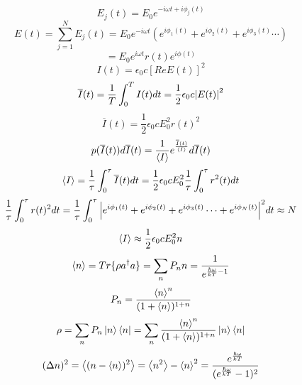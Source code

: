\documentclass[9pt]{article}
\begin{document}
\begin{equation}
    E_j(t)=E_0e^{-i\omega t + i\phi_j(t)}
\end{equation}
\begin{equation}
    E(t)=\sum^N_{j=1}E_j(t)=E_0e^{-i\omega t }(e^{i\phi_1(t)}+e^{i\phi_2(t)}+e^{i\phi_3(t)}\cdots)
\end{equation}
\begin{equation*}
        =E_0e^{i\omega t }r(t)e^{i\phi (t)}
\end{equation*}
\begin{equation}
    I(t)=\epsilon_0 c [Re E(t)]^2
\end{equation}
\begin{equation}
    \overline{I}(t)=\frac{1}{T}\int_0^T I(t) dt=\frac{1}{2}\epsilon_0 c \abs{E(t)}^2
\end{equation}
\begin{equation}
    \overline{I}(t)=\frac{1}{2}\epsilon_0 c E_0^2 r(t)^2
\end{equation}
\begin{equation}
    p(\overline{I}(t))d\overline{I}(t)=\frac{1}{\ev{I}}e^{\frac{\overline{I}(t)}{\ev{I}}}d\overline{I}(t)
\end{equation}
\begin{equation}
    \ev{I}=\frac{1}{\tau}\int_0^\tau \overline{I}(t) dt = \frac{1}{2}\epsilon_0 c E_0^2\frac{1}{\tau}\int_0^\tau r^2(t) dt
\end{equation}
\begin{equation}
    \frac{1}{\tau}\int_0^\tau r(t)^2 dt = \frac{1}{\tau}\int_0^\tau\abs{e^{i\phi_1(t)}+e^{i\phi_2(t)}+e^{i\phi_3(t)}\cdots+e^{i\phi_N(t)}}^2 dt \approx N
\end{equation}
\begin{equation*}
    \ev{I}\approx\frac{1}{2}\epsilon_0 c E_0^2n
\end{equation*}
\begin{equation}
    \ev{n}=Tr\{\rho a^\dagger a\} = \sum_n P_n n = \frac{1}{e^{\frac{\hbar\omega}{kT}-1}}
\end{equation}
\begin{equation}
    P_n=\frac{\ev{n}^n}{(1+\ev{n})^{1+n}}
\end{equation}
\begin{equation}
    \rho=\sum_n P_n \ket{n}\bra{n}= \sum_n \frac{\ev{n}^n}{(1+\ev{n})^{1+n}}\ket{n}\bra{n}
\end{equation}
\begin{equation}
    (\Delta n)^2 = \ev{(n-\ev{n})^2}=\ev{n^2}-\ev{n}^2=\frac{e^{\frac{\hbar\omega}{kT}}}{(e^{\frac{\hbar\omega}{kT}}-1)^2}
\end{equation}
\end{document}
